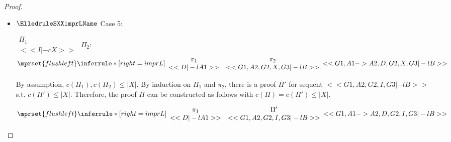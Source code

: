 \begin{proof}
\begin{enumerate}
\begin{itemize}
  \item $\ElledruleSXXimprLName$ Case 5:
      \begin{center}
        \scriptsize
        \begin{math}
          \begin{array}{c}
            \Pi_1 \\
            {<<I |-c X>>}
          \end{array}
        \end{math}
        \qquad\qquad
        $\Pi_2$:
        \begin{math}
          $$\mprset{flushleft}
          \inferrule* [right={\tiny imprL}] {
            {
              \begin{array}{cc}
                \pi_1 & \pi_2 \\
                {<<D |-l A1>>} & {<<G1, A2, G2, X, G3 |-l B>>}
              \end{array}
            }
          }{<<G1, A1 -> A2, D, G2, X, G3 |-l B>>}
        \end{math}
      \end{center}
      By assumption, $c(\Pi_1),c(\Pi_2)\leq |X|$. By induction on $\Pi_1$ and $\pi_2$, there is
      a proof $\Pi'$ for sequent $<<G1, A2, G2, I, G3 |-l B>>$ s.t. $c(\Pi') \leq |X|$.
      Therefore, the proof $\Pi$ can be constructed as follows with
      $c(\Pi) = c(\Pi') \leq |X|$.
      \begin{center}
        \scriptsize
        \begin{math}
          $$\mprset{flushleft}
          \inferrule* [right={\tiny imprL}] {
            {
              \begin{array}{cc}
                \pi_1 & \Pi' \\
                {<<D |-l A1>>} & {<<G1, A2, G2, I, G3 |-l B>>}
              \end{array}
            }
          }{<<G1, A1 -> A2, D, G2, I, G3 |-l B>>}
        \end{math}
      \end{center}


\end{itemize}
\end{enumerate}
\end{proof}
